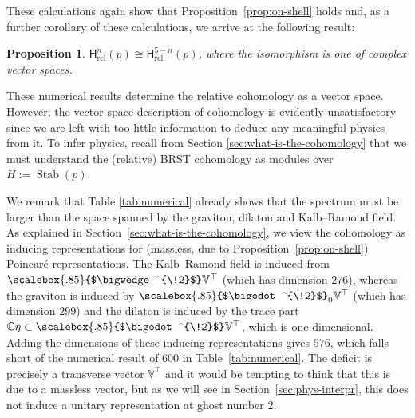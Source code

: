 \documentclass[11pt,reqno,a4paper,final]{amsart}
\newcommand\ext[1]{\scalebox{.85}{$\bigwedge^{\!#1}$}}
\newcommand\sym[1]{\scalebox{.85}{$\bigodot^{\!#1}$}}
\theoremstyle{plain}
\newtheorem{proposition}[lemma]{Proposition}
\theoremstyle{definition}
\newcommand{\Hrel}{\mathsf{H}_{\mathrm{rel}}}
\newcommand{\Stab}{\operatorname{Stab}}
\newcommand{\VV}{\mathbb{V}}
\newcommand{\CC}{\mathbb{C}}
\newcommand{\1}{\mathbb{1}}
\numberwithin{equation}{section}
\begin{document}
\begin{table}[h!]
  \caption*{The condition $p^2 = 0$ tacitly assumes that $p\neq 0$.}
\end{table}

These calculations again show that Proposition~\ref{prop:on-shell}
holds and, as a further corollary of these calculations, we arrive at
the following result:

\begin{proposition}\label{prop:vector-space-duality-Hrel}
  $\Hrel^n(p) \cong \Hrel^{5-n}(p)$, where the isomorphism is one of complex vector spaces.
\end{proposition}

These numerical results determine the relative cohomology as a vector
space.  However, the vector space description of cohomology is
evidently unsatisfactory since we are left with too little information
to deduce any meaningful physics from it. To infer physics, recall
from Section \ref{sec:what-is-the-cohomology} that we must understand
the (relative) BRST cohomology as modules over $H := \Stab(p)$.

We remark that Table \ref{tab:numerical} already shows that the spectrum
must be larger than the space spanned by the graviton, dilaton and
Kalb--Ramond field.  As explained in
Section~\ref{sec:what-is-the-cohomology}, we view the cohomology as
inducing representations for (massless, due to
Proposition~\ref{prop:on-shell}) Poincaré representations.  The
Kalb--Ramond field is induced from $\ext{2}\VV^\top$ (which has
dimension $276$), whereas the graviton is induced by
$\sym{2}_0\VV^\top$ (which has dimension $299$) and the dilaton is
induced by the trace part $\CC \eta \subset \sym{2}\VV^\top$, which
is one-dimensional.  Adding the dimensions of these inducing
representations gives $576$, which falls short of the numerical result
of $600$ in Table~\ref{tab:numerical}.  The deficit is precisely a
transverse vector $\VV^\top$ and it would be tempting to think that
this is due to a massless vector, but as we will see in
Section~\ref{sec:phys-interpr}, this does not induce a unitary
representation at ghost number $2$.
\end{document}
